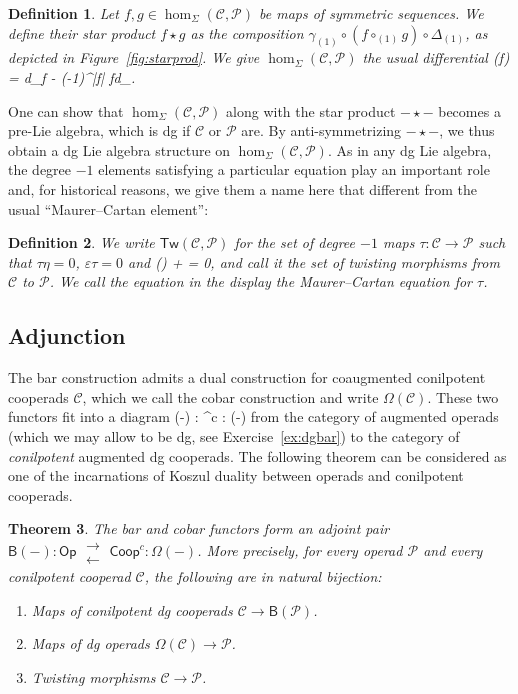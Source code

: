 \documentclass[fleqn, a4paper, twoside]{article}
\makeatletter
\newcommand{\adjoint}{\;\substack{\longrightarrow \\[-0.6ex] \longleftarrow}\;}
\newcommand{\Tw}{\mathsf{Tw}}
\newcommand{\0}{\langle 0\rangle}
\newcommand{\B}[1]{\mathsf{B}(#1)}
\newenvironment{tenumerate}{
 \begin{enumerate}
  \setlength{\itemsep}{0pt}
  \setlength{\parskip}{0pt}
}{\end{enumerate}}
\let\[\@undefined
\DeclareRobustCommand{\[}{\begin{equation}}%
\let\]\@undefined
\DeclareRobustCommand{\]}{\end{equation}}%
\theoremstyle{mytheorem}
\newtheorem{theorem}{Theorem}[section]
\theoremstyle{introthm}
\theoremstyle{mydefinition}
\newtheorem{definition}[theorem]{Definition}
\theoremstyle{mydefinition2}
\theoremstyle{plain} %
\newcommand{\CC}{\mathcal{C}}
\newcommand{\?}{\,?\,}
\newcommand{\PP}{{\mathcal{P}}}
\theoremstyle{mytheorem}
\theoremstyle{plain} %
\makeatother
\begin{document}
\begin{definition}
Let $f,g\in \hom_\Sigma(\CC,\PP)$ be maps of symmetric
sequences. We define their star product $f\star g$ 
as the composition
$\gamma_{(1)} \circ (f\circ_{(1)} g)\circ \Delta_{(1)}$,
as depicted in Figure~\ref{fig:starprod}. We give 
$\hom_\Sigma(\CC,\PP)$ the usual differential
\[
\partial(f) = d_\PP \circ f  - (-1)^{|f|} f\circ d_\CC.
\]
\end{definition}

One can show that $\hom_\Sigma(\CC,\PP)$ along with
the star product $-\star -$ becomes a pre-Lie algebra,
 which is dg if $\CC$ or $\PP$ are. By anti-symmetrizing
 $-\star -$, we thus obtain a dg Lie algebra structure
 on $\hom_\Sigma(\CC,\PP)$. As in any dg Lie algebra,
 the degree $-1$ elements satisfying a particular equation
 play an important role and, for historical reasons,
  we give them a name here that 
 different from the usual ``Maurer--Cartan element'':
 
\begin{definition}
We write $\Tw(\CC,\PP)$ for the set of degree $-1$ maps
$\tau : \CC\longrightarrow \PP$
such that $\tau\eta =0$, $\varepsilon\tau = 0$
and 
\[
\partial(\tau) + \tau\star \tau = 0,
\]
and call it the set of \emph{twisting morphisms} from
$\CC$ to $\PP$. We call the equation in the display the
\emph{Maurer--Cartan equation} for $\tau$.
\end{definition}


\subsection{Adjunction}
The bar construction admits a dual construction for
coaugmented conilpotent cooperads $\CC$, which we call
the cobar construction and write $\Omega(\CC)$. These
two functors fit into a diagram
\[
\B{-} :  \adjoint
   ^c  : \Omega(-)
\]
from the category of augmented operads (which we may allow to be
dg, see Exercise~\ref{ex:dgbar}) to the category of
\emph{conilpotent} augmented dg cooperads. The following
theorem can be considered as one of the incarnations of Koszul
duality between operads and conilpotent cooperads.

\begin{theorem}\label{thm:adjunction}
The bar and cobar functors form an adjoint pair
$\B{-} : \mathsf{Op} \adjoint \mathsf{Coop}^c  : \Omega(-)$.
More precisely, 
for every operad $\PP$ and every conilpotent cooperad
$\CC$, the following are in natural bijection:
\begin{tenumerate}
\item Maps of conilpotent dg cooperads $\CC \longrightarrow \B{\PP}$.
\item Maps of dg operads $\Omega(\CC) \longrightarrow\PP$.
\item Twisting morphisms $\CC \longrightarrow \PP$.
\end{tenumerate}
\end{theorem}
\end{document}
